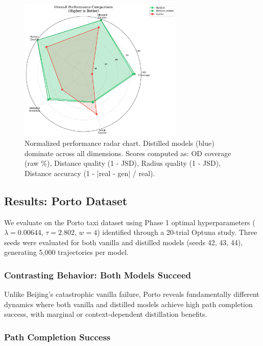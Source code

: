 \begin{figure}[h]
    \centering
    \includegraphics[width=0.7\textwidth]{assets/plots/hoser/performance_radar.pdf}
    \caption{Normalized performance radar chart. Distilled models (blue) dominate across all dimensions. Scores computed as: OD coverage (raw \%), Distance quality (1 - JSD), Radius quality (1 - JSD), Distance accuracy (1 - |real - gen| / real).}
    \label{fig:performance-radar}
\end{figure}

\subsection{Results: Porto Dataset}
\label{sec:eval-porto}

We evaluate on the Porto taxi dataset using Phase 1 optimal hyperparameters ($\lambda=0.00644$, $\tau=2.802$, $w=4$) identified through a 20-trial Optuna study. Three seeds were evaluated for both vanilla and distilled models (seeds 42, 43, 44), generating 5,000 trajectories per model.

\subsubsection{Contrasting Behavior: Both Models Succeed}

Unlike Beijing's catastrophic vanilla failure, Porto reveals fundamentally different dynamics where both vanilla and distilled models achieve high path completion success, with marginal or context-dependent distillation benefits.

\subsubsection{Path Completion Success}

